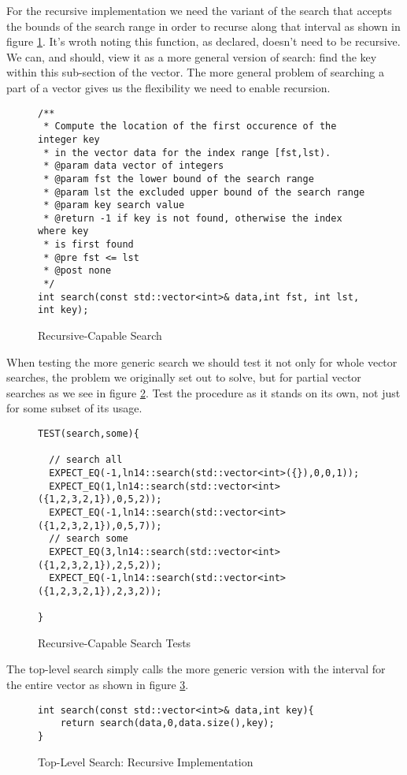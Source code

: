 \documentclass[]{tufte-handout}
\begin{document}
For the recursive implementation we need the variant of the search that accepts the bounds of the search range in order to recurse along that interval as shown in figure \ref{code:searchrecdecl}. It's wroth noting this function, as declared, doesn't need to be recursive. We can, and should, view it as a more general version of search: find the key within this sub-section of the vector. The more general problem of searching a part of a vector gives us the flexibility we need to enable recursion. 

\begin{figure}[htpb!]
\begin{lstlisting}
/**
 * Compute the location of the first occurence of the integer key
 * in the vector data for the index range [fst,lst).
 * @param data vector of integers
 * @param fst the lower bound of the search range
 * @param lst the excluded upper bound of the search range
 * @param key search value
 * @return -1 if key is not found, otherwise the index where key
 * is first found
 * @pre fst <= lst
 * @post none
 */
int search(const std::vector<int>& data,int fst, int lst, int key);	
\end{lstlisting}
\label{code:searchrecdecl}
\caption{Recursive-Capable Search}
\end{figure}

When testing the more generic search we should test it not only for whole vector searches, the problem we originally set out to solve, but for partial vector searches as we see in figure \ref{code:searchrectests}.  Test the procedure as it stands on its own, not just for some subset of its usage. 
\begin{figure}[htpb!]
\begin{lstlisting}
TEST(search,some){

  // search all
  EXPECT_EQ(-1,ln14::search(std::vector<int>({}),0,0,1));
  EXPECT_EQ(1,ln14::search(std::vector<int>({1,2,3,2,1}),0,5,2));
  EXPECT_EQ(-1,ln14::search(std::vector<int>({1,2,3,2,1}),0,5,7));
  // search some
  EXPECT_EQ(3,ln14::search(std::vector<int>({1,2,3,2,1}),2,5,2));
  EXPECT_EQ(-1,ln14::search(std::vector<int>({1,2,3,2,1}),2,3,2));

}
\end{lstlisting}
\label{code:searchrectests}
\caption{Recursive-Capable Search Tests}
\end{figure}

The top-level search simply calls the more generic version with the interval for the entire vector as shown in figure \ref{code:searchrectop}.
\begin{figure}[htpb!]
\begin{lstlisting}
int search(const std::vector<int>& data,int key){
	return search(data,0,data.size(),key);
}
\end{lstlisting}
\label{code:searchrectop}
\caption{Top-Level Search: Recursive Implementation}
\end{figure}
\end{document}
